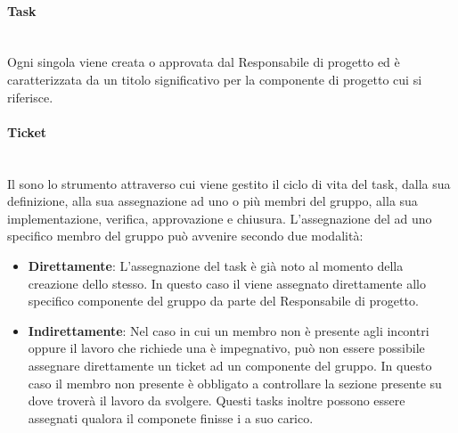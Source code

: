    \paragraph{Task}
     ~\\Ogni singola  viene creata o approvata dal Responsabile di progetto ed è caratterizzata da un titolo significativo per la componente di progetto cui si riferisce. 
    \paragraph{Ticket}
    ~\\Il {} sono lo strumento attraverso cui viene gestito il ciclo di vita del task, dalla sua definizione, alla sua assegnazione ad uno o più membri del gruppo, alla sua implementazione, verifica, approvazione e chiusura.
     L'assegnazione del  ad uno specifico membro del gruppo può avvenire secondo due modalità:
    \begin{itemize}
        \item \textbf{Direttamente}: L'assegnazione del task è già noto al momento della creazione dello stesso. In questo caso il  viene assegnato direttamente allo specifico componente del gruppo da parte del Responsabile di progetto.
        \item \textbf{Indirettamente}: Nel caso in cui un membro non è presente agli incontri oppure il lavoro che richiede una  è impegnativo, può non essere possibile assegnare direttamente un ticket ad un componente del gruppo. In questo caso il membro non presente è obbligato a controllare la sezione  presente su  dove troverà il lavoro da svolgere. Questi tasks inoltre possono essere assegnati qualora il componete finisse i  a suo carico.
    \end{itemize}

\newpage
    